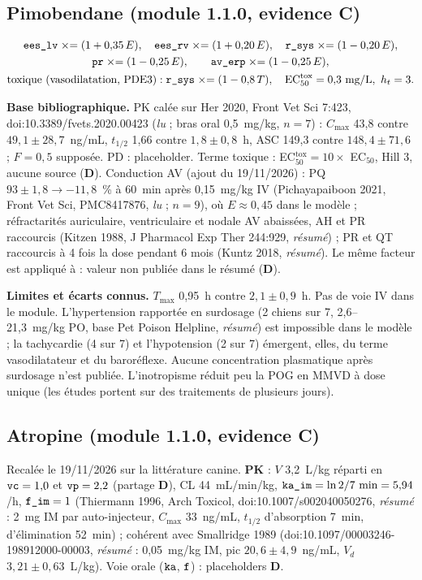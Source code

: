\documentclass[10pt,a4paper]{article}
\newcommand{\vp}[1]{\text{\texttt{\detokenize{#1}}}}
\newcommand{\evD}{\textcolor{red!70!black}{\textbf{D}}}
\newcommand{\acc}[1]{\textsl{#1}}
\newcommand{\limite}[1]{\par\textbf{Limites et écarts connus.} #1}
\newcommand{\sources}[1]{\par\textbf{Base bibliographique.} #1}
\begin{document}
\subsection{Pimobendane (module 1.1.0, evidence C)}
\begin{gather}
\vp{ees_lv} \mathrel{\times}= (1 + 0{,}35\,E),\quad \vp{ees_rv} \mathrel{\times}= (1 + 0{,}20\,E),\quad \vp{r_sys} \mathrel{\times}= (1 - 0{,}20\,E),\\
\vp{pr} \mathrel{\times}= (1 - 0{,}25\,E),\qquad \vp{av_erp} \mathrel{\times}= (1 - 0{,}25\,E),\\
\text{toxique (vasodilatation, PDE3)} : \vp{r_sys} \mathrel{\times}= (1 - 0{,}8\,T),\quad \text{EC}_{50}^\text{tox} = 0{,}3~\text{mg/L},\ h_t = 3.
\end{gather}
\sources{PK calée sur Her 2020, Front Vet Sci 7:423, doi:10.3389/fvets.2020.00423 (\acc{lu} ; bras oral 0,5~mg/kg, $n = 7$) : $C_\text{max}$ 43,8 contre $49{,}1 \pm 28{,}7$~ng/mL, $t_{1/2}$ 1,66 contre $1{,}8 \pm 0{,}8$~h, ASC 149,3 contre $148{,}4 \pm 71{,}6$ ; $F = 0{,}5$ supposée. PD : placeholder. Terme toxique : EC$_{50}^\text{tox} = 10\times$ EC$_{50}$, Hill 3, aucune source (\evD{}).
Conduction AV (ajout du 19/11/2026) : PQ $93 \pm 1{,}8 \to -11{,}8$~\% à 60~min après 0,15~mg/kg IV
(Pichayapaiboon 2021, Front Vet Sci, PMC8417876, \acc{lu} ; $n = 9$), où $E \approx 0{,}45$ dans le
modèle ; réfractarités auriculaire, ventriculaire et nodale AV abaissées, AH et PR raccourcis
(Kitzen 1988, J Pharmacol Exp Ther 244:929, \acc{résumé}) ; PR et QT raccourcis à 4 fois la dose
pendant 6 mois (Kuntz 2018, \acc{résumé}). Le même facteur est appliqué à \vp{av_erp} : valeur non
publiée dans le résumé (\evD{}).}
\limite{$T_\text{max}$ 0,95~h contre $2{,}1 \pm 0{,}9$~h. Pas de voie IV dans le module. L'hypertension rapportée en surdosage (2 chiens sur 7, 2,6--21,3~mg/kg PO, base Pet Poison Helpline, \acc{résumé}) est impossible dans le modèle ; la tachycardie (4 sur 7) et l'hypotension (2 sur 7) émergent, elles, du terme vasodilatateur et du baroréflexe. Aucune concentration plasmatique après surdosage n'est publiée. L'inotropisme réduit peu la POG en MMVD à dose unique (les études portent sur des traitements de plusieurs jours).}

\subsection{Atropine (module 1.1.0, evidence C)}\label{sec:atropine}
Recalée le 19/11/2026 sur la littérature canine. \textbf{PK} : $V$ 3,2~L/kg réparti en
$\vp{vc} = 1{,}0$ et $\vp{vp} = 2{,}2$ (partage \evD{}), CL 44~mL/min/kg,
$\vp{ka_im} = \ln 2 / 7~\text{min} = 5{,}94$/h, $\vp{f_im} = 1$ (Thiermann 1996, Arch Toxicol,
doi:10.1007/s002040050276, \acc{résumé} : 2~mg IM par auto-injecteur, $C_\text{max}$ 33~ng/mL,
$t_{1/2}$ d'absorption 7~min, d'élimination 52~min) ; cohérent avec Smallridge 1989
(doi:10.1097/00003246-198912000-00003, \acc{résumé} : 0,05~mg/kg IM, pic $20{,}6 \pm 4{,}9$~ng/mL,
$V_d$ $3{,}21 \pm 0{,}63$~L/kg). Voie orale ($\vp{ka}$, $\vp{f}$) : placeholders \evD{}.
\end{document}
